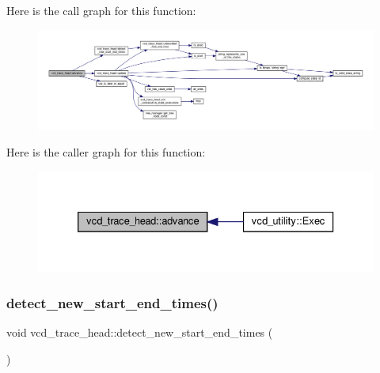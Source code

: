 Here is the call graph for this function\+:
\nopagebreak
\begin{figure}[H]
\begin{center}
\leavevmode
\includegraphics[width=350pt]{df/d30/structvcd__trace__head_a20ce69cc689b656626dd0400b8606e95_cgraph}
\end{center}
\end{figure}
Here is the caller graph for this function\+:
\nopagebreak
\begin{figure}[H]
\begin{center}
\leavevmode
\includegraphics[width=333pt]{df/d30/structvcd__trace__head_a20ce69cc689b656626dd0400b8606e95_icgraph}
\end{center}
\end{figure}
\mbox{\label{structvcd__trace__head_ab2ccd52157df2b0a82e47dec7a3942c4}} 
\subsubsection{\texorpdfstring{detect\+\_\+new\+\_\+start\+\_\+end\+\_\+times()}{detect\_new\_start\_end\_times()}}
{\footnotesize\ttfamily void vcd\+\_\+trace\+\_\+head\+::detect\+\_\+new\+\_\+start\+\_\+end\+\_\+times (\begin{DoxyParamCaption}{ }\end{DoxyParamCaption})\hspace{0.3cm}{\ttfamily [protected]}}



